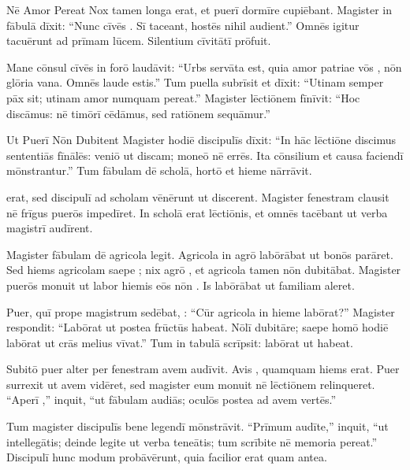 \documentclass[12pt]{nextbook}
\begin{document}
\begin{readersection}{Nē Amor Pereat}
Nox tamen longa erat, et puerī dormīre cupiēbant. Magister in fābulā dīxit: “Nunc cīvēs . Sī taceant, hostēs nihil audient.” Omnēs igitur tacuērunt  ad prīmam lūcem. Silentium cīvitātī prōfuit.

Mane cōnsul cīvēs in forō laudāvit: “Urbs servāta est, quia amor patriae vōs , nōn glōria vana. Omnēs laude  estis.” Tum puella subrīsit et dīxit: “Utinam semper pāx sit; utinam amor numquam pereat.” Magister lēctiōnem fīnīvit: “Hoc discāmus: nē timōrī cēdāmus, sed ratiōnem sequāmur.”

\end{readersection}

\begin{readersection}{Ut Puerī Nōn Dubitent}
Magister hodiē discipulīs dīxit: “In hāc lēctiōne discimus sententiās fīnālēs: veniō ut discam; moneō nē errēs. Ita cōnsilium et causa faciendī mōnstrantur.” Tum fābulam dē scholā, hortō et hieme nārrāvit.

 erat, sed discipulī ad scholam vēnērunt ut discerent. Magister fenestram clausit nē frīgus puerōs impedīret. In scholā erat  lēctiōnis, et omnēs tacēbant ut verba magistrī audīrent.

Magister fābulam dē agricola legit. Agricola in agrō labōrābat ut  bonōs parāret. Sed hiems agricolam saepe ; nix agrō , et agricola tamen nōn dubitābat. Magister puerōs monuit ut labor hiemis eōs nōn . Is labōrābat ut familiam aleret.

Puer, quī prope magistrum sedēbat, : “Cūr agricola in hieme labōrat?” Magister respondit: “Labōrat ut postea frūctūs habeat. Nōlī dubitāre; saepe homō hodiē labōrat ut crās melius vīvat.” Tum in tabulā scrīpsit: labōrat ut habeat.

Subitō puer alter per fenestram avem audīvit. Avis , quamquam hiems erat. Puer surrexit ut avem vidēret, sed magister eum monuit nē lēctiōnem relinqueret. “Aperī ,” inquit, “ut fābulam audiās; oculōs postea ad avem vertēs.”

Tum magister discipulīs  bene legendī mōnstrāvit. “Prīmum audīte,” inquit, “ut intellegātis; deinde legite ut verba teneātis; tum scrībite nē memoria pereat.” Discipulī hunc modum probāvērunt, quia facilior erat quam antea.


\end{readersection}
\end{document}
